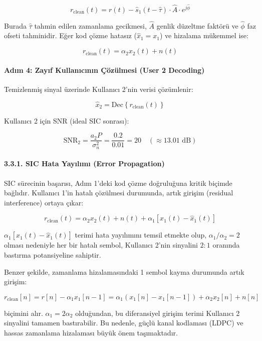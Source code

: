 \documentclass[
]{IEEEtran}
\begin{document}
\[r_{\text{clean}}(t) = r(t) - \hat{s}_1(t - \hat{\tau}) \cdot \hat{A} \cdot e^{j\hat{\phi}}\]

Burada \(\hat{\tau}\) tahmin edilen zamanlama gecikmesi, \(\hat{A}\)
genlik düzeltme faktörü ve \(\hat{\phi}\) faz ofseti tahminidir. Eğer
kod çözme hatasız (\(\hat{x}_1 = x_1\)) ve hizalama mükemmel ise:

\[r_{\text{clean}}(t) = \alpha_2 x_2(t) + n(t)\]

\paragraph{Adım 4: Zayıf Kullanıcının Çözülmesi (User 2
Decoding)}\label{adux131m-4-zayux131f-kullanux131cux131nux131n-uxe7uxf6zuxfclmesi-user-2-decoding}

Temizlenmiş sinyal üzerinde Kullanıcı 2'nin verisi çözümlenir:

\[\hat{x}_2 = \text{Dec}\left\{ r_{\text{clean}}(t) \right\}\]

Kullanıcı 2 için SNR (ideal SIC sonrası):

\[\text{SNR}_2 = \frac{a_2 P}{\sigma_n^2} = \frac{0.2}{0.01} = 20 \quad (\approx 13.01 \text{ dB})\]

\paragraph{3.3.1. SIC Hata Yayılımı (Error
Propagation)}\label{sic-hata-yayux131lux131mux131-error-propagation}

SIC sürecinin başarısı, Adım 1'deki kod çözme doğruluğuna kritik biçimde
bağlıdır. Kullanıcı 1'in hatalı çözülmesi durumunda, artık girişim
(residual interference) ortaya çıkar:

\[r_{\text{clean}}(t) = \alpha_2 x_2(t) + n(t) + \alpha_1 \left[ x_1(t) - \hat{x}_1(t) \right]\]

\(\alpha_1 \left[ x_1(t) - \hat{x}_1(t) \right]\) terimi hata yayılımını
temsil etmekte olup, \(\alpha_1 / \alpha_2 = 2\) olması nedeniyle her
bir hatalı sembol, Kullanıcı 2'nin sinyalini \(2:1\) oranında bastırma
potansiyeline sahiptir.

Benzer şekilde, zamanlama hizalamasındaki 1 sembol kayma durumunda artık
girişim:

\[r_{\text{clean}}[n] = r[n] - \alpha_1 x_1[n-1] = \alpha_1(x_1[n] - x_1[n-1]) + \alpha_2 x_2[n] + n[n]\]

biçimini alır. \(\alpha_1 = 2\alpha_2\) olduğundan, bu diferansiyel
girişim terimi Kullanıcı 2 sinyalini tamamen bastırabilir. Bu nedenle,
güçlü kanal kodlaması (LDPC) ve hassas zamanlama hizalaması büyük önem
taşımaktadır.
\end{document}
